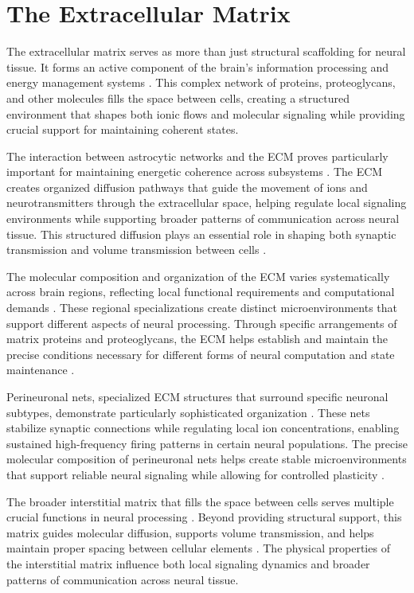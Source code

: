 \section{The Extracellular Matrix}

The extracellular matrix serves as more than just structural scaffolding for neural tissue. It forms an active component of the brain's information processing and energy management systems \cite{Dityatev2010}. This complex network of proteins, proteoglycans, and other molecules fills the space between cells, creating a structured environment that shapes both ionic flows and molecular signaling while providing crucial support for maintaining coherent states.

The interaction between astrocytic networks and the ECM proves particularly important for maintaining energetic coherence across subsystems \cite{Song2018}. The ECM creates organized diffusion pathways that guide the movement of ions and neurotransmitters through the extracellular space, helping regulate local signaling environments while supporting broader patterns of communication across neural tissue. This structured diffusion plays an essential role in shaping both synaptic transmission and volume transmission between cells \cite{Sykova2008}.

The molecular composition and organization of the ECM varies systematically across brain regions, reflecting local functional requirements and computational demands \cite{Bandtlow2000}. These regional specializations create distinct microenvironments that support different aspects of neural processing. Through specific arrangements of matrix proteins and proteoglycans, the ECM helps establish and maintain the precise conditions necessary for different forms of neural computation and state maintenance \cite{Zimmermann2008}.

Perineuronal nets, specialized ECM structures that surround specific neuronal subtypes, demonstrate particularly sophisticated organization \cite{Wang2012}. These nets stabilize synaptic connections while regulating local ion concentrations, enabling sustained high-frequency firing patterns in certain neural populations. The precise molecular composition of perineuronal nets helps create stable microenvironments that support reliable neural signaling while allowing for controlled plasticity \cite{Kwok2011}.

The broader interstitial matrix that fills the space between cells serves multiple crucial functions in neural processing \cite{Ruoslahti1996}. Beyond providing structural support, this matrix guides molecular diffusion, supports volume transmission, and helps maintain proper spacing between cellular elements \cite{Nicholson1998}. The physical properties of the interstitial matrix influence both local signaling dynamics and broader patterns of communication across neural tissue.

